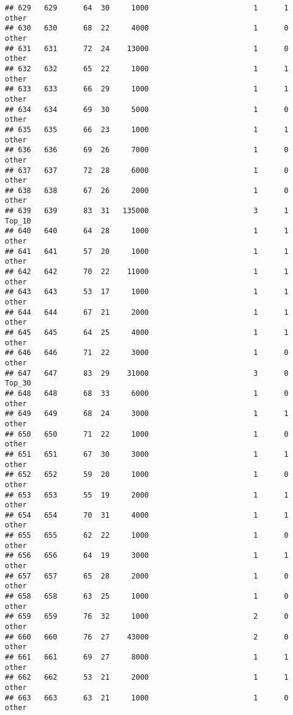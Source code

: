 \documentclass[
]{article}
\begin{document}
\begin{verbatim}
## 629   629      64  30     1000                        1      1    other
## 630   630      68  22     4000                        1      0    other
## 631   631      72  24    13000                        1      0    other
## 632   632      65  22     1000                        1      1    other
## 633   633      66  29     1000                        1      1    other
## 634   634      69  30     5000                        1      0    other
## 635   635      66  23     1000                        1      1    other
## 636   636      69  26     7000                        1      0    other
## 637   637      72  28     6000                        1      0    other
## 638   638      67  26     2000                        1      0    other
## 639   639      83  31   135000                        3      1   Top_10
## 640   640      64  28     1000                        1      1    other
## 641   641      57  20     1000                        1      1    other
## 642   642      70  22    11000                        1      1    other
## 643   643      53  17     1000                        1      1    other
## 644   644      67  21     2000                        1      1    other
## 645   645      64  25     4000                        1      1    other
## 646   646      71  22     3000                        1      0    other
## 647   647      83  29    31000                        3      0   Top_30
## 648   648      68  33     6000                        1      0    other
## 649   649      68  24     3000                        1      1    other
## 650   650      71  22     1000                        1      0    other
## 651   651      67  30     3000                        1      1    other
## 652   652      59  20     1000                        1      0    other
## 653   653      55  19     2000                        1      1    other
## 654   654      70  31     4000                        1      1    other
## 655   655      62  22     1000                        1      0    other
## 656   656      64  19     3000                        1      1    other
## 657   657      65  28     2000                        1      0    other
## 658   658      63  25     1000                        1      0    other
## 659   659      76  32     1000                        2      0    other
## 660   660      76  27    43000                        2      0    other
## 661   661      69  27     8000                        1      1    other
## 662   662      53  21     2000                        1      1    other
## 663   663      63  21     1000                        1      0    other

\end{verbatim}
\end{document}
